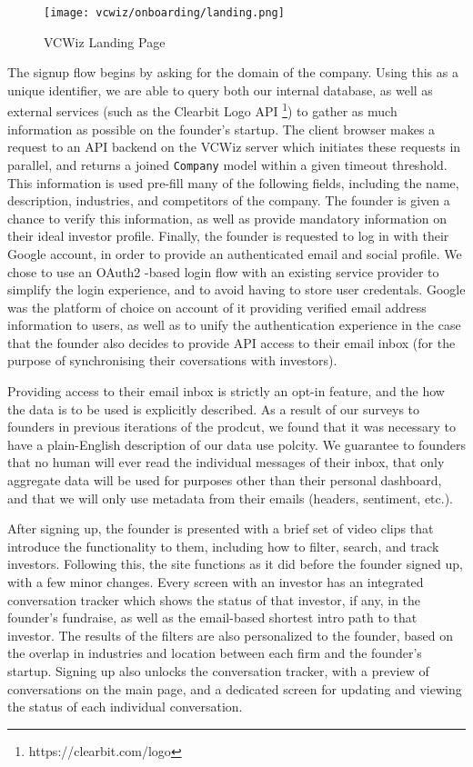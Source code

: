\begin{figure}[ht]
  \texttt{[image: vcwiz/onboarding/landing.png]}
  \centering
  \caption*{VCWiz Landing Page}
\end{figure}

The signup flow begins by asking for the domain of the company. Using this as a unique identifier, we are able to query both our internal database, as well as external services (such as the Clearbit Logo API \footnote{https://clearbit.com/logo}) to gather as much information as possible on the founder's startup. The client browser makes a request to an API backend on the VCWiz server which initiates these requests in parallel, and returns a joined \texttt{Company} model within a given timeout threshold. This information is used pre-fill many of the following fields, including the name, description, industries, and competitors of the company. The founder is given a chance to verify this information, as well as provide mandatory information on their ideal investor profile. Finally, the founder is requested to log in with their Google account, in order to provide an authenticated email and social profile. We chose to use an OAuth2 \cite{hardt2012oauth}-based login flow with an existing service provider to simplify the login experience, and to avoid having to store user credentals. Google was the platform of choice on account of it providing verified email address information to users, as well as to unify the authentication experience in the case that the founder also decides to provide API access to their email inbox (for the purpose of synchronising their coversations with investors).

Providing access to their email inbox is strictly an opt-in feature, and the how the data is to be used is explicitly described. As a result of our surveys to founders in previous iterations of the prodcut, we found that it was necessary to have a plain-English description of our data use polcity. We guarantee to founders that no human will ever read the individual messages of their inbox, that only aggregate data will be used for purposes other than their personal dashboard, and that we will only use metadata from their emails (headers, sentiment, etc.).

After signing up, the founder is presented with a brief set of video clips that introduce the functionality to them, including how to filter, search, and track investors. Following this, the site functions as it did before the founder signed up, with a few minor changes. Every screen with an investor has an integrated conversation tracker which shows the status of that investor, if any, in the founder's fundraise, as well as the email-based shortest intro path to that investor. The results of the filters are also personalized to the founder, based on the overlap in industries and location between each firm and the founder's startup. Signing up also unlocks the conversation tracker, with a preview of conversations on the main page, and a dedicated screen for updating and viewing the status of each individual conversation.


